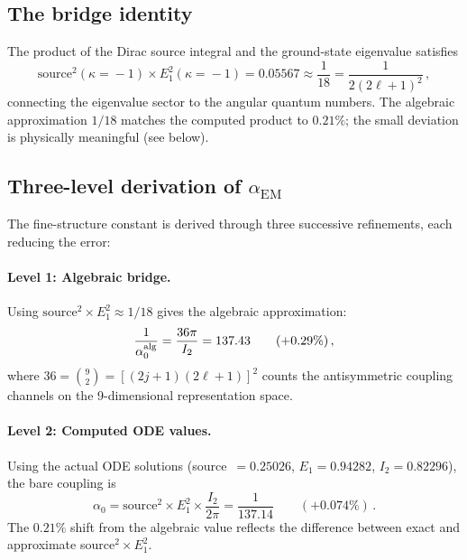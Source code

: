 \documentclass[aps,prd,twocolumn,superscriptaddress,nofootinbib,longbibliography]{revtex4-2}
\newcommand{\aEM}{\alpha_{\mathrm{EM}}}
\begin{document}
\subsection{The bridge identity}

The product of the Dirac source integral and the ground-state
eigenvalue satisfies
\begin{equation}\label{eq:bridge}
  \mathrm{source}^2(\kappa\!=\!{-}1) \times E_1^2(\kappa\!=\!{-}1)
  = 0.05567
  \approx \frac{1}{18}
  = \frac{1}{2(2\ell+1)^2}\,,
\end{equation}
connecting the eigenvalue sector to the angular quantum numbers.  The
algebraic approximation $1/18$ matches the computed product to
$0.21\%$; the small deviation is physically meaningful (see below).

\subsection{Three-level derivation of $\aEM$}\label{sec:alpha-chain}

The fine-structure constant is derived through three successive
refinements, each reducing the error:

\paragraph{Level 1: Algebraic bridge.}  Using $\mathrm{source}^2
\times E_1^2 \approx 1/18$ gives the algebraic approximation:
\begin{equation}\label{eq:alpha-bare}
  \frac{1}{\alpha_0^{\rm alg}}
  = \frac{36\pi}{I_2} = 137.43
  \qquad(+0.29\%)\,,
\end{equation}
where $36 = \binom{9}{2} = [(2j\!+\!1)(2\ell\!+\!1)]^2$ counts the
antisymmetric coupling channels on the 9-dimensional
representation space.

\paragraph{Level 2: Computed ODE values.}  Using the actual ODE
solutions (source~$= 0.25026$, $E_1 = 0.94282$, $I_2 = 0.82296$),
the bare coupling is
\begin{equation}\label{eq:alpha-ode}
  \alpha_0 = \mathrm{source}^2 \times E_1^2
    \times \frac{I_2}{2\pi} = \frac{1}{137.14}
  \qquad(+0.074\%)\,.
\end{equation}
The $0.21\%$ shift from the algebraic value reflects the difference
between exact and approximate source$^2 \times E_1^2$.
\end{document}
